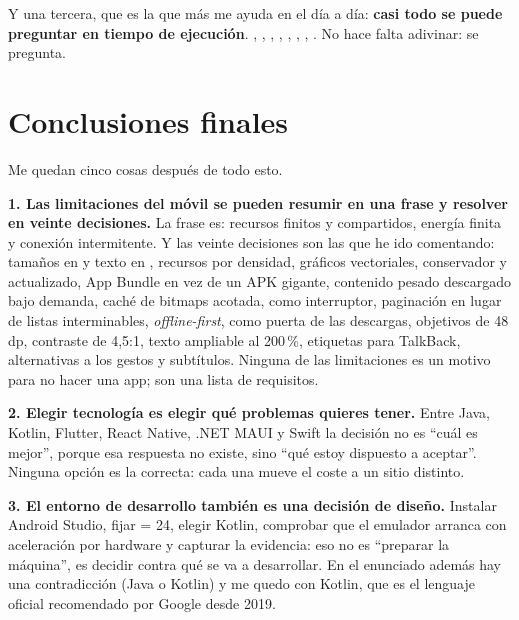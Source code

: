 Y una tercera, que es la que más me ayuda en el día a día: \textbf{casi todo se puede preguntar en tiempo de ejecución}. , , , , , , , . No hace falta adivinar: se pregunta.

\newpage
\section*{Conclusiones finales}

Me quedan cinco cosas después de todo esto.

\textbf{1. Las limitaciones del móvil se pueden resumir en una frase y resolver en veinte decisiones.} La frase es: recursos finitos y compartidos, energía finita y conexión intermitente. Y las veinte decisiones son las que he ido comentando: tamaños en  y texto en , recursos por densidad, gráficos vectoriales,  conservador y  actualizado, App Bundle en vez de un APK gigante, contenido pesado descargado bajo demanda, caché de bitmaps acotada,  como interruptor, paginación en lugar de listas interminables, \emph{offline-first},  como puerta de las descargas, objetivos de 48 dp, contraste de 4,5:1, texto ampliable al 200\,\%, etiquetas para TalkBack, alternativas a los gestos y subtítulos. Ninguna de las limitaciones es un motivo para no hacer una app; son una lista de requisitos.

\textbf{2. Elegir tecnología es elegir qué problemas quieres tener.} Entre Java, Kotlin, Flutter, React Native, .NET MAUI y Swift la decisión no es \enquote{cuál es mejor}, porque esa respuesta no existe, sino \enquote{qué estoy dispuesto a aceptar}. Ninguna opción es la correcta: cada una mueve el coste a un sitio distinto.

\textbf{3. El entorno de desarrollo también es una decisión de diseño.} Instalar Android Studio, fijar  = 24, elegir Kotlin, comprobar que el emulador arranca con aceleración por hardware y capturar la evidencia: eso no es \enquote{preparar la máquina}, es decidir contra qué se va a desarrollar. En el enunciado además hay una contradicción (Java o Kotlin) y me quedo con Kotlin, que es el lenguaje oficial recomendado por Google desde 2019.

